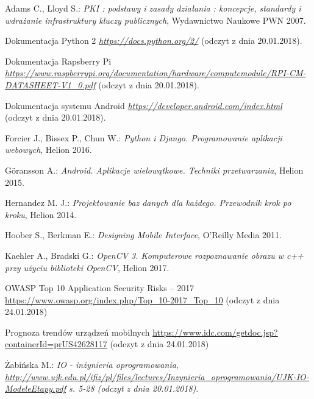 \newpage
   \begin{thebibliography}{99}
    	Adams C., Lloyd S.: 
    	\textit{PKI : podstawy i zasady działania : koncepcje, standardy i wdrażanie infrastruktury kluczy publicznych}, Wydawnictwo Naukowe PWN 2007.
    	
    	Dokumentacja Python 2
    	\textit{ \href  {https://docs.python.org/2/}{https://docs.python.org/2/} }(odczyt z dnia 20.01.2018).
    	
    	Dokumentacja Rapsberry Pi \\
    	\textit{ \href {https://www.raspberrypi.org/documentation/hardware/computemodule/RPI-CM-DATASHEET-V1_0.pdf} {https://www.raspberrypi.org/documentation/hardware/computemodule/RPI-CM-DATASHEET-V1\_0.pdf} }(odczyt z dnia 20.01.2018).
    	 
    	Dokumentacja systemu Android
    	\textit{ \href {https://developer.android.com/index.html} {https://developer.android.com/index.html} }(odczyt z dnia 20.01.2018).
    	 
    	Forcier J., Bissex P., Chun W.:
    	\textit{Python i Django. Programowanie aplikacji webowych}, 
    	Helion 2016.
    	
    	Göransson A.: 
    	\textit{Android. Aplikacje wielowątkowe. Techniki przetwarzania}, 
    	Helion 2015. 
    	
    	Hernandez M. J.: 
    	\textit{Projektowanie baz danych dla każdego. Przewodnik krok po kroku}, 
    	Helion 2014.
    	
    	Hoober S., Berkman E.: 
    	\textit{Designing Mobile Interface}, 
    	 O'Reilly Media 2011.
    	 
    	 Kaehler A., Bradski G.: 
    	 \textit{OpenCV 3. Komputerowe rozpoznawanie obrazu w c++ przy użyciu biblioteki OpenCV}, Helion 2017.
    	 
    	 OWASP Top 10 Application Security Risks -- 2017\\
    	 \href{https://www.owasp.org/index.php/Top_10-2017_Top_10}{https://www.owasp.org/index.php/Top\_10-2017\_Top\_10} (odczyt z dnia 24.01.2018)
    	 
    	 Prognoza trendów urządzeń mobilnych
    	 \href{https://www.idc.com/getdoc.jsp?containerId=prUS42628117}{https://www.idc.com/getdoc.jsp?containerId=prUS42628117} (odczyt z dnia 24.01.2018)
    	 
    	 Żabińska M.: \textit{IO - inżynieria oprogramowania},\\
    	 \textit{\href{http://www.ujk.edu.pl/ifiz/pl/files/lectures/Inzynieria\_oprogramowania/UJK-IO-ModeleEtapy.pdf}{http://www.ujk.edu.pl/ifiz/pl/files/lectures/Inzynieria\_oprogramowania/UJK-IO-ModeleEtapy.pdf} s. 5-28 (odczyt z dnia 20.01.2018)}.
     \end{thebibliography}
 
